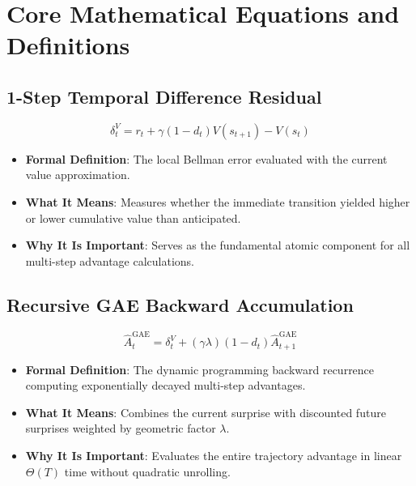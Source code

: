 \documentclass[11pt,a4paper]{article}
\theoremstyle{definition}
\begin{document}
\section{Core Mathematical Equations and Definitions}

\subsection{1-Step Temporal Difference Residual}
{\boldmath
\begin{equation}
\delta_t^V = r_t + \gamma (1 - d_t) V(s_{t+1}) - V(s_t)
\end{equation}
}
\begin{itemize}
    \item \textbf{Formal Definition}: The local Bellman error evaluated with the current value approximation.
    \item \textbf{What It Means}: Measures whether the immediate transition yielded higher or lower cumulative value than anticipated.
    \item \textbf{Why It Is Important}: Serves as the fundamental atomic component for all multi-step advantage calculations.
\end{itemize}

\subsection{Recursive GAE Backward Accumulation}
{\boldmath
\begin{equation}
\widehat{A}_t^{\text{GAE}} = \delta_t^V + (\gamma \lambda) (1 - d_t) \widehat{A}_{t+1}^{\text{GAE}}
\end{equation}
}
\begin{itemize}
    \item \textbf{Formal Definition}: The dynamic programming backward recurrence computing exponentially decayed multi-step advantages.
    \item \textbf{What It Means}: Combines the current surprise with discounted future surprises weighted by geometric factor $\lambda$.
    \item \textbf{Why It Is Important}: Evaluates the entire trajectory advantage in linear $\Theta(T)$ time without quadratic unrolling.
\end{itemize}
\end{document}
